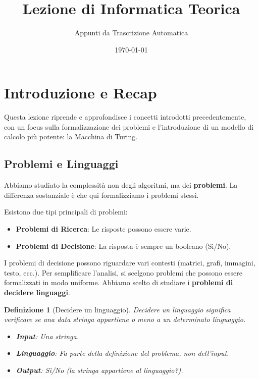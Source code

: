 \documentclass[a4paper]{article}
\title{Lezione di Informatica Teorica}
\author{Appunti da Trascrizione Automatica}
\date{\today}
\newtheorem{definition}{Definizione}
\begin{document}
\maketitle
\tableofcontents
\newpage

\section{Introduzione e Recap}

Questa lezione riprende e approfondisce i concetti introdotti precedentemente, con un focus sulla formalizzazione dei problemi e l'introduzione di un modello di calcolo più potente: la Macchina di Turing.

\subsection{Problemi e Linguaggi}
Abbiamo studiato la complessità non degli algoritmi, ma dei \textbf{problemi}. La differenza sostanziale è che qui formalizziamo i problemi stessi.

Esistono due tipi principali di problemi:
\begin{itemize}
    \item \textbf{Problemi di Ricerca}: Le risposte possono essere varie.
    \item \textbf{Problemi di Decisione}: La risposta è sempre un booleano (Sì/No).
\end{itemize}

I problemi di decisione possono riguardare vari contesti (matrici, grafi, immagini, testo, ecc.). Per semplificare l'analisi, si scelgono problemi che possono essere formalizzati in modo uniforme. Abbiamo scelto di studiare i \textbf{problemi di decidere linguaggi}.

\begin{definition}[Decidere un linguaggio]
    Decidere un linguaggio significa verificare se una data stringa appartiene o meno a un determinato linguaggio.
    \begin{itemize}
        \item \textbf{Input}: Una stringa.
        \item \textbf{Linguaggio}: Fa parte della definizione del problema, non dell'input.
        \item \textbf{Output}: Sì/No (la stringa appartiene al linguaggio?).
    \end{itemize}
\end{definition}
\end{document}
